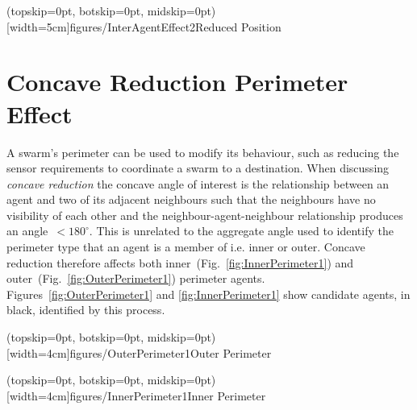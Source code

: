 \documentclass{ieeeaccess}
\begin{document}
\Figure[t!](topskip=0pt, botskip=0pt, midskip=0pt)[width=5cm]{figures/InterAgentEffect2}{Reduced Position\label{fig:InterAgentEffect2}}

\section{Concave Reduction Perimeter Effect}\label{sec:ConcaveReductionPerimeterEffect}
A swarm's perimeter can be used to modify its behaviour, such as reducing the sensor requirements to coordinate a swarm to a destination. When discussing \textit{concave reduction} the concave angle of interest is the relationship between an agent and two of its adjacent neighbours such that the neighbours have no visibility of each other and the neighbour-agent-neighbour relationship produces an angle~$< 180^\circ$. This is unrelated to the aggregate angle used to identify the perimeter type that an agent is a member of i.e. inner or outer. Concave reduction therefore affects both inner~(Fig.~\ref{fig:InnerPerimeter1}) and outer~(Fig.~\ref{fig:OuterPerimeter1}) perimeter agents. Figures~\ref{fig:OuterPerimeter1} and \ref{fig:InnerPerimeter1} show candidate agents, in black, identified by this process. 

\Figure[t!](topskip=0pt, botskip=0pt, midskip=0pt)[width=4cm]{figures/OuterPerimeter1}{Outer Perimeter\label{fig:OuterPerimeter1}}

\Figure[t!](topskip=0pt, botskip=0pt, midskip=0pt)[width=4cm]{figures/InnerPerimeter1}{Inner Perimeter\label{fig:InnerPerimeter1}}
\end{document}
